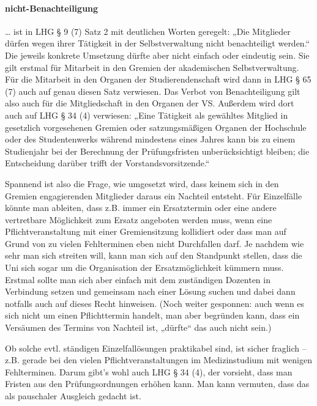 \documentclass[
10pt,
a4paper,
twoside,								%
titlepage=false,							%
draft=false								%
]{scrartcl}
\begin{document}
\paragraph{nicht-Benachteiligung}

… ist in LHG § 9 (7) Satz 2 mit deutlichen Worten geregelt: „Die Mitglieder dürfen wegen ihrer Tätigkeit in der Selbstverwaltung nicht benachteiligt werden.“ Die jeweils konkrete Umsetzung dürfte aber nicht einfach oder eindeutig sein. Sie gilt erstmal für Mitarbeit in den Gremien der akademischen Selbstverwaltung. Für die Mitarbeit in den Organen der Studierendenschaft wird dann in LHG § 65 (7) auch auf genau diesen Satz verwiesen. Das Verbot von Benachteiligung gilt also auch für die Mitgliedschaft in den Organen der VS. Außerdem wird dort auch auf LHG § 34 (4) verwiesen: „Eine Tätigkeit als gewähltes Mitglied in gesetzlich vorgesehenen Gremien oder satzungsmäßigen Organen der Hochschule oder des Studentenwerks während mindestens eines Jahres kann bis zu einem Studienjahr bei der Berechnung der Prüfungsfristen unberücksichtigt bleiben; die Entscheidung darüber trifft der Vorstandsvorsitzende.“

Spannend ist also die Frage, wie umgesetzt wird, dass keinem sich in den Gremien engagierenden Mitglieder daraus ein Nachteil entsteht. Für Einzelfälle könnte man ableiten, dass z.B. immer ein Ersatztermin oder eine andere vertretbare Möglichkeit zum Ersatz angeboten werden muss, wenn eine Pflichtveranstaltung mit einer Gremiensitzung kollidiert oder dass man auf Grund von zu vielen Fehlterminen eben nicht Durchfallen darf. Je nachdem wie sehr man sich streiten will, kann man sich auf den Standpunkt stellen, dass die Uni sich sogar um die Organisation der Ersatzmöglichkeit kümmern muss. Erstmal sollte man sich aber einfach mit dem zuständigen Dozenten in Verbindung setzen und gemeinsam nach einer Lösung suchen und dabei dann notfalls auch auf dieses Recht hinweisen. (Noch weiter gesponnen: auch wenn es sich nicht um einen Pflichttermin handelt, man aber begründen kann, dass ein Versäumen des Termins von Nachteil ist, „dürfte“ das auch nicht sein.)

Ob solche evtl. ständigen Einzelfallösungen praktikabel sind, ist sicher fraglich – z.B. gerade bei den vielen Pflichtveranstaltungen im Medizinstudium mit wenigen Fehlterminen. Darum gibt's wohl auch LHG § 34 (4), der vorsieht, dass man Fristen aus den Prüfungsordnungen erhöhen kann. Man kann vermuten, dass das als pauschaler Ausgleich gedacht ist.
\end{document}
